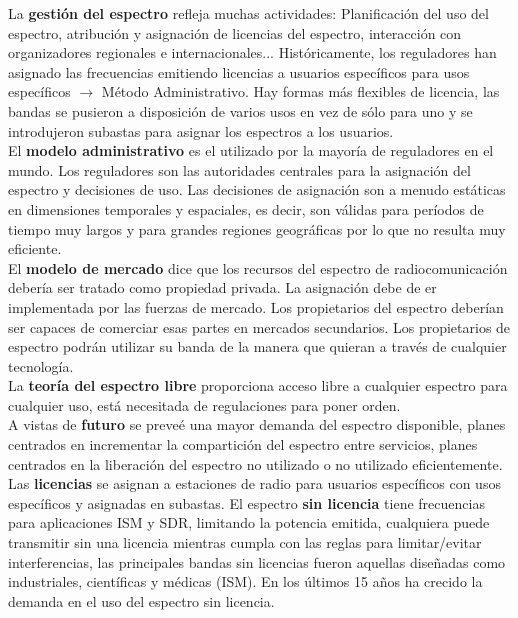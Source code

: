 \documentclass[10pt,portrait, twocolumn]{article}
\begin{document}
La \textbf{gestión del espectro} refleja muchas actividades: Planificación del uso del espectro, atribución y asignación de licencias del espectro, interacción con organizadores regionales e internacionales... Históricamente, los reguladores han asignado las frecuencias emitiendo licencias a usuarios específicos para usos específicos $\rightarrow$ Método Administrativo. Hay formas más flexibles de licencia, las bandas se pusieron a disposición de varios usos en vez de sólo para uno y se introdujeron subastas para asignar los espectros a los usuarios.\\

El \textbf{modelo administrativo} es el utilizado por la mayoría de reguladores en el mundo. Los reguladores son las autoridades centrales para la asignación del espectro y decisiones de uso. Las decisiones de asignación son a menudo estáticas en dimensiones temporales y espaciales, es decir, son válidas para períodos de tiempo muy largos y para grandes regiones geográficas por lo que no resulta muy eficiente.\\

El \textbf{modelo de mercado} dice que los recursos del espectro de radiocomunicación debería ser tratado como propiedad privada. La asignación debe de er implementada por las fuerzas de mercado. Los propietarios del espectro deberían ser capaces de comerciar esas partes en mercados secundarios. Los propietarios de espectro podrán utilizar su banda de la manera que quieran a través de cualquier tecnología.\\

La \textbf{teoría del espectro libre} proporciona acceso libre a cualquier espectro para cualquier uso, está necesitada de regulaciones para poner orden.\\

A vistas de \textbf{futuro} se preveé una mayor demanda del espectro disponible, planes centrados en incrementar la compartición del espectro entre servicios, planes centrados en la liberación del espectro no utilizado o no utilizado eficientemente.\\

Las \textbf{licencias} se asignan a estaciones de radio para usuarios específicos con usos específicos y asignadas en subastas. El espectro \textbf{sin licencia} tiene frecuencias para aplicaciones ISM y SDR, limitando la potencia emitida, cualquiera puede transmitir sin una licencia mientras cumpla con las reglas para limitar/evitar interferencias, las principales bandas sin licencias fueron aquellas diseñadas como industriales, científicas y médicas (ISM). En los últimos 15 años ha crecido la demanda en el uso del espectro sin licencia.
\end{document}
